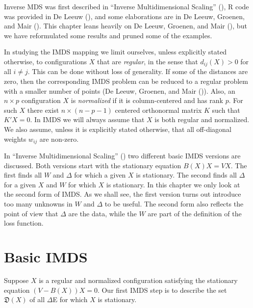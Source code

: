 \documentclass[
  12pt,
  letterpaper,
  DIV=11,
  numbers=noendperiod]{scrreprt}
\theoremstyle{remark}
\begin{document}
Inverse MDS was first described in {``{Inverse Multidimensional
Scaling}''} (), R code was
provided in De Leeuw (), and some
elaborations are in De Leeuw, Groenen, and Mair
(). This chapter leans
heavily on De Leeuw, Groenen, and Mair
(), but we have
reformulated some results and pruned some of the examples.

In studying the IMDS mapping we limit ourselves, unless explicitly
stated otherwise, to configurations \(X\) that are \emph{regular}, in
the sense that \(d_{ij}(X)>0\) for all \(i\not= j\). This can be done
without loss of generality. If some of the distances are zero, then the
corresponding IMDS problem can be reduced to a regular problem with a
smaller number of points (De Leeuw, Groenen, and Mair
()). Also, an
\(n\times p\) configuration \(X\) is \emph{normalized} if it is
column-centered and has rank \(p\). For such \(X\) there exist
\(n\times (n-p-1)\) centered orthonormal matrix \(K\) such that
\(K'X=0\). In IMDS we will always assume that \(X\) is both regular and
normalized. We also assume, unless it is explicitly stated otherwise,
that all off-diagonal weights \(w_{ij}\) are non-zero.

In {``{Inverse Multidimensional Scaling}''}
() two different basic IMDS
versions are discussed. Both versions start with the stationary equation
\(B(X)X=VX\). The first finds all \(W\) and \(\Delta\) for which a given
\(X\) is stationary. The second finds all \(\Delta\) for a given \(X\)
and \(W\) for which \(X\) is stationary. In this chapter we only look at
the second form of IMDS. As we shall see, the first version turns out
introduce too many unknowns in \(W\) and \(\Delta\) to be useful. The
second form also reflects the point of view that \(\Delta\) are the
data, while the \(W\) are part of the definition of the loss function.

\section{Basic IMDS}\label{basic-imds}

Suppose \(X\) is a regular and normalized configuration satisfying the
stationary equation \((V-B(X))X=0\). Our first IMDS step is to describe
the set \(\mathfrak{D}(X)\) of all \(\Delta\)E for which \(X\) is
stationary.
\end{document}
